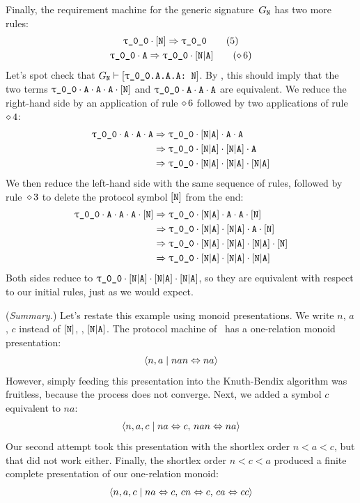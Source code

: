 \documentclass[../generics]{subfiles}
\begin{document}
\begin{example}
Finally, the requirement machine for the generic signature~$G_{\texttt{N}}$ has two more rules:
\begin{gather*}
\ProtoConf{\rT}{N}\tag{5}\\
\rT\cdot\nA\Red\rT\cdot\aNA\tag{$\CRule{6}$}
\end{gather*}
Let's spot check that $G_\tN \vdash \ConfReq{\rT.A.A.A}{N}$. By , this should imply that the two terms $\rT\cdot\nA\cdot\nA\cdot\nA\cdot\pN$ and $\rT\cdot\nA\cdot\nA\cdot\nA$ are equivalent. We reduce the right-hand side by an application of rule $\diamond\, 6$ followed by two applications of rule $\diamond\, 4$:
\begin{align*}
\rT\cdot\nA\cdot\nA\cdot\nA & \Red \rT\cdot\aNA\cdot\nA\cdot\nA \\
& \Red \rT\cdot\aNA\cdot\aNA\cdot\nA \\
& \Red \rT\cdot\aNA\cdot\aNA\cdot\aNA
\end{align*}
We then reduce the left-hand side with the same sequence of rules, followed by rule~$\diamond\, 3$ to delete the protocol symbol $[\texttt{N}]$ from the end:
\begin{align*}
\rT\cdot\nA\cdot\nA\cdot\nA\cdot\pN & \Red \rT\cdot\aNA\cdot\nA\cdot\nA\cdot\pN \\
& \Red \rT\cdot\aNA\cdot\aNA\cdot\nA\cdot\pN \\
& \Red \rT\cdot\aNA\cdot\aNA\cdot\aNA\cdot\pN \\
& \Red \rT\cdot\aNA\cdot\aNA\cdot\aNA
\end{align*}
Both sides reduce to $\rT\cdot\aNA\cdot\aNA\cdot\aNA$, so they are equivalent with respect to our initial rules, just as we would expect.

\smallskip

(\emph{Summary.})
Let's restate this example using monoid presentations. We write $n$, $a$, $c$ instead of $[\texttt{N}]$, \nA, $[\texttt{N}|\texttt{A}]$. The protocol machine of \tN\ has a one-relation monoid presentation:
\[
\langle n, a \mid nan \Leftrightarrow na\rangle
\]
However, simply feeding this presentation into the Knuth-Bendix algorithm was fruitless, because the process does not converge. Next, we added a symbol $c$ equivalent to $na$:
\[
\langle n, a, c \mid na \Leftrightarrow c,\, nan \Leftrightarrow na\rangle
\]
Our second attempt took this presentation with the shortlex order $n < a < c$, but that did not work either. Finally, the shortlex order $n < c < a$ produced a finite complete presentation of our one-relation monoid:
\[
\langle n, a, c \mid na \Leftrightarrow c,\, cn \Leftrightarrow c,\, ca \Leftrightarrow cc\rangle
\]
\end{example}
\end{document}
